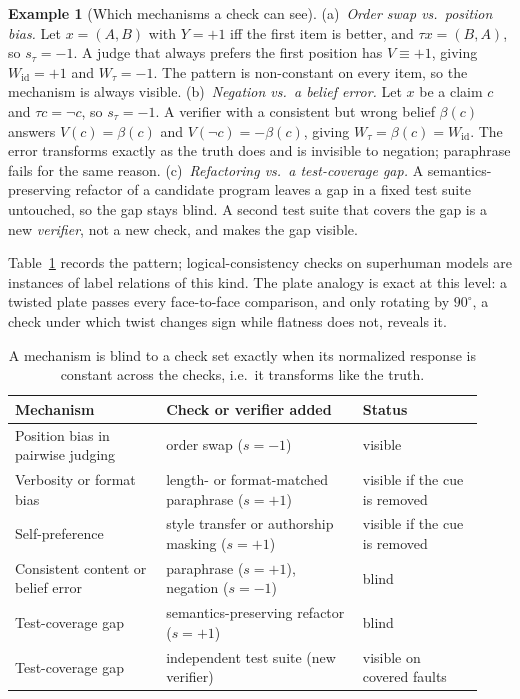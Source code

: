 \documentclass[11pt]{article}
\theoremstyle{definition}
\newtheorem{example}{Example}
\theoremstyle{remark}
\begin{document}
\begin{example}[Which mechanisms a check can see]
(a)~\emph{Order swap vs.\ position bias.} Let $x=(A,B)$ with $Y=+1$ iff the first item is better, and $\tau x=(B,A)$, so $s_\tau=-1$. A judge that always prefers the first position has $V\equiv+1$, giving $W_{\mathrm{id}}=+1$ and $W_\tau=-1$. The pattern is non-constant on every item, so the mechanism is always visible.
(b)~\emph{Negation vs.\ a belief error.} Let $x$ be a claim $c$ and $\tau c=\neg c$, so $s_\tau=-1$. A verifier with a consistent but wrong belief $\beta(c)$ answers $V(c)=\beta(c)$ and $V(\neg c)=-\beta(c)$, giving $W_\tau=\beta(c)=W_{\mathrm{id}}$. The error transforms exactly as the truth does and is invisible to negation; paraphrase fails for the same reason.
(c)~\emph{Refactoring vs.\ a test-coverage gap.} A semantics-preserving refactor of a candidate program leaves a gap in a fixed test suite untouched, so the gap stays blind. A second test suite that covers the gap is a new \emph{verifier}, not a new check, and makes the gap visible.
\end{example}

Table~\ref{tab:mech} records the pattern; logical-consistency checks on superhuman models \cite{fluri2023} are instances of label relations of this kind. The plate analogy is exact at this level: a twisted plate passes every face-to-face comparison, and only rotating by $90^\circ$, a check under which twist changes sign while flatness does not, reveals it.

\begin{table}[t]
\centering\small
\begin{tabular}{@{}>{\raggedright\arraybackslash}p{0.30\linewidth}>{\raggedright\arraybackslash}p{0.39\linewidth}>{\raggedright\arraybackslash}p{0.24\linewidth}@{}}
\toprule
Mechanism & Check or verifier added & Status\\
\midrule
Position bias in pairwise judging & order swap ($s=-1$) & visible\\
Verbosity or format bias & length- or format-matched paraphrase ($s=+1$) & visible if the cue is removed\\
Self-preference & style transfer or authorship masking ($s=+1$) & visible if the cue is removed\\
Consistent content or belief error & paraphrase ($s=+1$), negation ($s=-1$) & blind\\
Test-coverage gap & semantics-preserving refactor ($s=+1$) & blind\\
Test-coverage gap & independent test suite (new verifier) & visible on covered faults\\
\bottomrule
\end{tabular}
\caption{A mechanism is blind to a check set exactly when its normalized response is constant across the checks, i.e.\ it transforms like the truth.}
\label{tab:mech}
\end{table}
\end{document}
